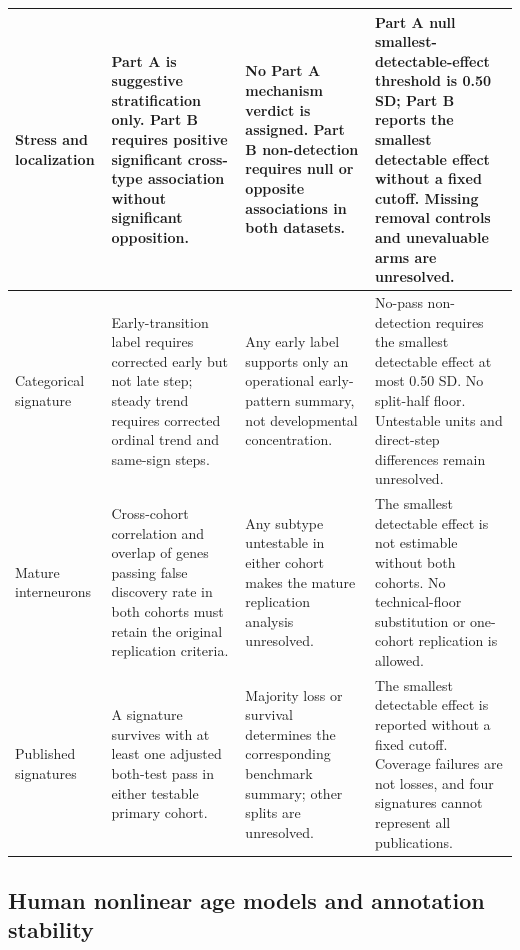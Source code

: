 \documentclass[11pt]{article}
\begin{document}
{\begin{longtable}{p{}p{}p{}p{}}
Stress and localization & Part A is suggestive stratification only. Part B requires positive significant cross-type association without significant opposition. & No Part A mechanism verdict is assigned. Part B non-detection requires null or opposite associations in both datasets. & Part A null smallest-detectable-effect threshold is 0.50 SD; Part B reports the smallest detectable effect without a fixed cutoff. Missing removal controls and unevaluable arms are unresolved. \\ \hline
Categorical signature & Early-transition label requires corrected early but not late step; steady trend requires corrected ordinal trend and same-sign steps. & Any early label supports only an operational early-pattern summary, not developmental concentration. & No-pass non-detection requires the smallest detectable effect at most 0.50 SD. No split-half floor. Untestable units and direct-step differences remain unresolved. \\ \hline
Mature interneurons & Cross-cohort correlation and overlap of genes passing false discovery rate in both cohorts must retain the original replication criteria. & Any subtype untestable in either cohort makes the mature replication analysis unresolved. & The smallest detectable effect is not estimable without both cohorts. No technical-floor substitution or one-cohort replication is allowed. \\ \hline
Published signatures & A signature survives with at least one adjusted both-test pass in either testable primary cohort. & Majority loss or survival determines the corresponding benchmark summary; other splits are unresolved. & The smallest detectable effect is reported without a fixed cutoff. Coverage failures are not losses, and four signatures cannot represent all publications. \\ \hline
\end{longtable}}

\subsection*{Human nonlinear age models and annotation stability}
\end{document}
